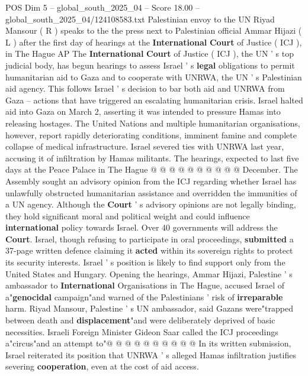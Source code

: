 \begin{textsample}{POS Dim 5 – global\_south\_2025\_04 – Score 18.00 – global\_south\_2025\_04/124108583.txt}  \label{ex:f5_pos_082}
Palestinian envoy to the UN Riyad Mansour ( R ) speaks to the the press next to Palestinian official Ammar Hijazi ( L ) after the first day of hearings at the \textbf{International} \textbf{Court} of Justice ( ICJ ), in The Hague AP The \textbf{International} \textbf{Court} of Justice ( ICJ ), the UN ' s top judicial body, has begun hearings to assess Israel ' s \textbf{legal} obligations to permit humanitarian aid to Gaza and to cooperate with UNRWA, the UN ' s Palestinian aid agency.
This follows Israel ' s decision to bar both aid and UNRWA from Gaza -- actions that have triggered an escalating humanitarian crisis.
Israel halted aid into Gaza on March 2, asserting it was intended to pressure Hamas into releasing hostages.
The United Nations and multiple humanitarian organisations, however, report rapidly deteriorating conditions, imminent famine and complete collapse of medical infrastructure.
Israel severed ties with UNRWA last year, accusing it of infiltration by Hamas militants.
The hearings, expected to last five days at the Peace Palace in The Hague @ @ @ @ @ @ @ @ @ @ December.
The Assembly sought an advisory opinion from the ICJ regarding whether Israel has unlawfully obstructed humanitarian assistance and overridden the immunities of a UN agency.
Although the \textbf{Court} ' s advisory opinions are not legally binding, they hold significant moral and political weight and could influence \textbf{international} policy towards Israel.
Over 40 governments will address the \textbf{Court}.
Israel, though refusing to participate in oral proceedings, \textbf{submitted} a 37-page written defence claiming it \textbf{acted} within its sovereign rights to protect its security interests.
Israel ' s position is likely to find support only from the United States and Hungary.
Opening the hearings, Ammar Hijazi, Palestine ' s ambassador to \textbf{International} Organisations in The Hague, accused Israel of a"\textbf{genocidal} campaign"and warned of the Palestinians ' risk of \textbf{irreparable} harm.
Riyad Mansour, Palestine ' s UN ambassador, said Gazans were"trapped between death and \textbf{displacement}"and were deliberately deprived of basic necessities.
Israeli Foreign Minister Gideon Saar called the ICJ proceedings a"circus"and an attempt to"@ @ @ @ @ @ @ @ @ @ In its written submission, Israel reiterated its position that UNRWA ' s alleged Hamas infiltration justifies severing \textbf{cooperation}, even at the cost of aid access.

\end{textsample}
